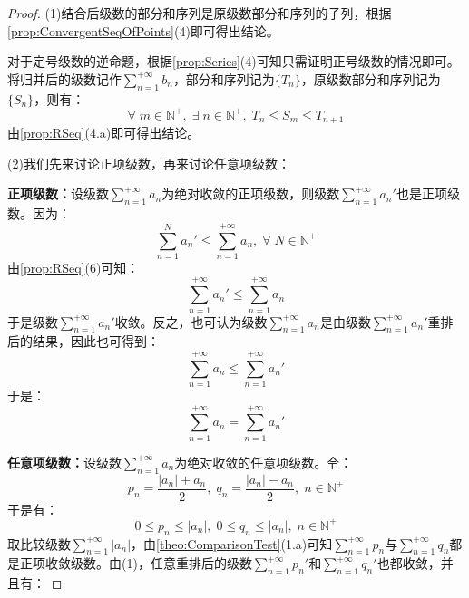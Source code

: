 \begin{proof}
	(1)结合后级数的部分和序列是原级数部分和序列的子列，根据\cref{prop:ConvergentSeqOfPoints}(4)即可得出结论。\par
	对于定号级数的逆命题，根据\cref{prop:Series}(4)可知只需证明正号级数的情况即可。将归并后的级数记作$\sum\limits_{n=1}^{+\infty}b_n$，部分和序列记为$\{T_n\}$，原级数部分和序列记为$\{S_n\}$，则有：
	\begin{equation*}
		\forall\;m\in\mathbb{N}^+,\;\exists\;n\in\mathbb{N}^+,\;T_n\leqslant S_m\leqslant T_{n+1}
	\end{equation*}
	由\cref{prop:RSeq}(4.a)即可得出结论。\par
	(2)我们先来讨论正项级数，再来讨论任意项级数：\par
	\textbf{正项级数：}设级数$\sum\limits_{n=1}^{+\infty}a_n$为绝对收敛的正项级数，则级数$\sum\limits_{n=1}^{+\infty}a_n'$也是正项级数。因为：
	\begin{equation*}
		\sum_{n=1}^Na_n'\leqslant\sum_{n=1}^{+\infty}a_n,\;\forall\;N\in\mathbb{N}^+
	\end{equation*}
	由\cref{prop:RSeq}(6)可知：
	\begin{equation*}
		\sum_{n=1}^{+\infty}a_n'\leqslant\sum_{n=1}^{+\infty}a_n
	\end{equation*}
	于是级数$\sum\limits_{n=1}^{+\infty}a_n'$收敛。反之，也可认为级数$\sum\limits_{n=1}^{+\infty}a_n$是由级数$\sum\limits_{n=1}^{+\infty}a_n'$重排后的结果，因此也可得到：
	\begin{equation*}
		\sum_{n=1}^{+\infty}a_n\leqslant\sum_{n=1}^{+\infty}a_n'
	\end{equation*}
	于是：
	\begin{equation*}
		\sum_{n=1}^{+\infty}a_n=\sum_{n=1}^{+\infty}a_n'
	\end{equation*}\par
	\textbf{任意项级数：}设级数$\sum\limits_{n=1}^{+\infty}a_n$为绝对收敛的任意项级数。令：
	\begin{equation*}
		p_n=\frac{|a_n|+a_n}{2},\;q_n=\frac{|a_n|-a_n}{2},\;n\in\mathbb{N}^+
	\end{equation*}
	于是有：
	\begin{equation*}
		0\leqslant p_n\leqslant|a_n|,\;0\leqslant q_n\leqslant|a_n|,\;n\in\mathbb{N}^+
	\end{equation*}
	取比较级数$\sum\limits_{n=1}^{+\infty}|a_n|$，由\cref{theo:ComparisonTest}(1.a)可知$\sum\limits_{n=1}^{+\infty}p_n$与$\sum\limits_{n=1}^{+\infty}q_n$都是正项收敛级数。由(1)，任意重排后的级数$\sum\limits_{n=1}^{+\infty}p_n'$和$\sum\limits_{n=1}^{+\infty}q_n'$也都收敛，并且有：

\end{proof}
